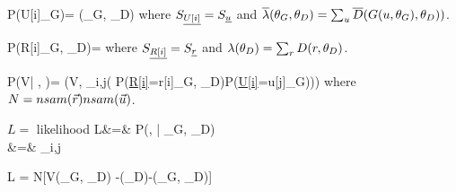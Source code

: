 \beq\color{blue}
P(U[i]\cond \theta_G)=
{\ol{\lam}(\theta_G, \theta_D)}
\eeq
where  $S_{\underline{U[i]}}=S_{\underline{u}}$ and $\overline{\lambda}(\theta_G, \theta_D)=\sum_u\overline{D}(G(u, \theta_G), \theta_D))$.

\beq\color{blue}
P(R[i]\cond \theta_G, \theta_D)= 
\eeq
where $S_{\underline{R[i]}}=S_{\underline{r}}$ and  $\lambda(\theta_D)=\sum_r D(r, \theta_D)$.


\beq\color{blue}
P(V| \vecu,  \vecr)=
\delta(V, \ln \prod_{i,j}(
P(\ul{R[i]}=r[i]\cond \theta_G, \theta_D)P(\ul{U[i]}=u[j]\cond \theta_G)))
\eeq
where $N=nsam({\vec{r}})nsam({\vec{u}})$.


$ L=$ likelihood
\beqa
 L&=&
P(\vecr, \vecu| \theta_G, \theta_D)\\
&=&
\prod_{i,j}
\eeqa

\beq
\ln  L = N[V(\theta_G, \theta_D)
-\ln \lam(\theta_D)-\ln \ol{\lam}(\theta_G, \theta_D)]
\eeq



